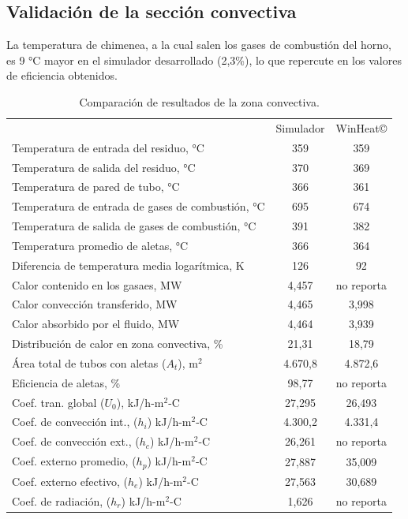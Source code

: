 \subsection{Validación de la sección convectiva}
\par La temperatura de chimenea, a la cual salen los gases de combustión del horno, es 9 °C mayor en el simulador desarrollado (2,3\%), lo que repercute en los valores de eficiencia obtenidos.
\begin{table}[H] \begin{center}
\caption[Resultados en zona convectiva]
{Comparación de resultados de la zona convectiva.}
\label{tbl:compara-zc} \begin{tabular}{l|c|c}
	& Simulador & WinHeat\copyright \\
Temperatura de entrada del residuo, °C		& 359 & 359	\\
Temperatura de salida del residuo, °C		& 370 & 369	\\
Temperatura de pared de tubo, °C		    & 366 & 361	\\
Temperatura de entrada de gases de combustión, °C	& 695 & 674	\\
Temperatura de salida de gases de combustión, °C	& 391 & 382	\\
Temperatura promedio de aletas, °C          & 366 & 364\\
Diferencia de temperatura media logarítmica, K	& 126 & 92 \\
\hline
Calor contenido en los gasaes, MW   & 4,457 & no reporta \\
Calor convección transferido, MW	& 4,465 & 3,998	\\
Calor absorbido por el fluido, MW	& 4,464 & 3,939	\\
Distribución de calor en zona convectiva, \%& 21,31 &  18,79 \\
\hline
Área total de tubos con aletas ($A_t$), m$^2$& 4.670,8 & 4.872,6 \\
Eficiencia de aletas, \%			& 98,77 & no reporta \\
\hline
Coef. tran. global ($U_0$), kJ/h-m$^2$-C	& 27,295 & 26,493 \\
Coef. de convección int., ($h_i$) kJ/h-m$^2$-C	& 4.300,2 & 4.331,4 \\
Coef. de convección ext., ($h_c$) kJ/h-m$^2$-C	& 26,261 & no reporta \\
Coef. externo promedio, ($h_p$) kJ/h-m$^2$-C	& 27,887 & 35,009 \\
Coef. externo efectivo, ($h_e$) kJ/h-m$^2$-C	& 27,563 & 30,689 \\
Coef. de radiación, ($h_r$) kJ/h-m$^2$-C	& 1,626  & no reporta \\
\end{tabular} \end{center} \end{table}
